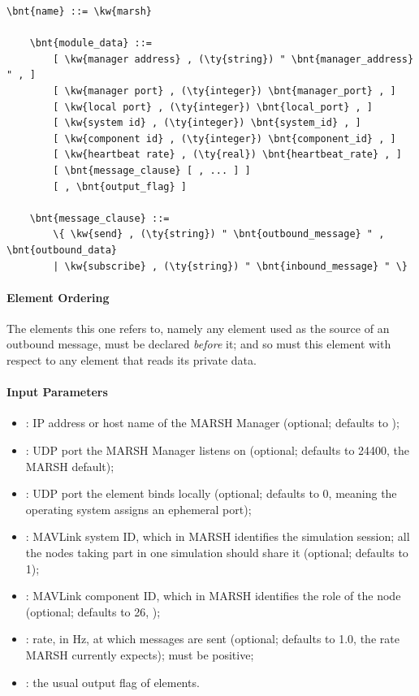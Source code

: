 \begin{Verbatim}[commandchars=\\\{\}]
    \bnt{name} ::= \kw{marsh}

    \bnt{module_data} ::=
        [ \kw{manager address} , (\ty{string}) " \bnt{manager_address} " , ]
        [ \kw{manager port} , (\ty{integer}) \bnt{manager_port} , ]
        [ \kw{local port} , (\ty{integer}) \bnt{local_port} , ]
        [ \kw{system id} , (\ty{integer}) \bnt{system_id} , ]
        [ \kw{component id} , (\ty{integer}) \bnt{component_id} , ]
        [ \kw{heartbeat rate} , (\ty{real}) \bnt{heartbeat_rate} , ]
        [ \bnt{message_clause} [ , ... ] ]
        [ , \bnt{output_flag} ]

    \bnt{message_clause} ::=
        \{ \kw{send} , (\ty{string}) " \bnt{outbound_message} " , \bnt{outbound_data}
        | \kw{subscribe} , (\ty{string}) " \bnt{inbound_message} " \}
\end{Verbatim}

\paragraph{Element Ordering}
The elements this one refers to, namely any 
element used as the source of an outbound message, must be declared
\emph{before} it; and so must this element with respect to any element that
reads its private data.

\paragraph{Input Parameters}
\begin{itemize}
    \item {}: IP address or host name of the MARSH
        Manager (optional; defaults to );
    \item {}: UDP port the MARSH Manager listens on
        (optional; defaults to 24400, the MARSH default);
    \item {}: UDP port the element binds locally (optional;
        defaults to 0, meaning the operating system assigns an ephemeral
        port);
    \item {}: MAVLink system ID, which in MARSH identifies the
        simulation session; all the nodes taking part in one simulation
        should share it (optional; defaults to 1);
    \item {}: MAVLink component ID, which in MARSH
        identifies the role of the node (optional; defaults to 26,
        );
    \item {}: rate, in Hz, at which 
        messages are sent (optional; defaults to 1.0, the rate MARSH
        currently expects); must be positive;
    \item {}: the usual output flag of elements.
\end{itemize}

